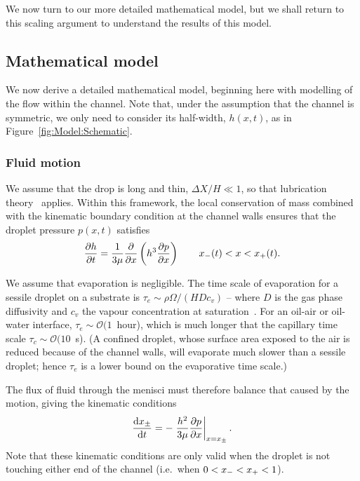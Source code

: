 We now turn to our more detailed mathematical model, but we shall return to this scaling argument to understand the results of this model.
\subsection{Mathematical model}\label{S:Theoretical:Model}
We now derive a detailed mathematical model, beginning here with modelling of the flow within the channel. Note that, under the assumption that the channel is symmetric, we only need to consider its half-width, $h(x,t)$, as in Figure~\ref{fig:Model:Schematic}.

\subsubsection{Fluid motion}
We assume that the drop is long and thin, $\Delta X/H \ll 1$, so that lubrication theory~\citep{Leal2007} applies. Within this framework, the local conservation of mass combined with the kinematic boundary condition at the channel walls ensures that the droplet pressure $p(x,t)$ satisfies
\begin{equation}\label{E:Chapter2:Model:MathModel:Fluid:Reynolds}
\frac{\partial h}{\partial t} = \frac{1}{3\mu}\frac{\partial }{\partial x}\left(h^3\frac{\partial p}{\partial x}\right) \qquad x_{-}(t) < x < x_{+}(t).
\end{equation}

We assume that evaporation is negligible. The time scale of evaporation for a sessile droplet on a substrate is $\tau_{e} \sim \rho \Omega/(H D c_v)$ -- where $D$ is the gas phase diffusivity and $c_v$ the vapour concentration at saturation~\citep{Hu2002JPhysChemB}. For an oil-air or oil-water interface, $\tau_{e} \sim \mathcal{O}(1$~hour), which is much longer that the capillary time scale $\tau_c \sim \mathcal{O}(10$~s).  (A confined droplet, whose surface area exposed to the air is reduced because of the channel walls, will evaporate much slower than a sessile droplet; hence $\tau_{e}$ is a lower bound on the evaporative time scale.)

The flux of fluid through the menisci must therefore balance that caused by the motion, giving the kinematic conditions
\begin{equation}\label{E:Chapter2:Model:MathModel:Fluid:Kinematic}
\frac{\mathrm{d} x_{\pm}}{\mathrm{d} t} = -\left.\frac{h^2}{3\mu}\frac{\partial p}{\partial x}\right|_{x = x_{\pm}}.
\end{equation}
Note that these kinematic conditions are only valid when the droplet is not touching either end of the channel (i.e.~when $0 < x_{-} < x_{+} < 1$).

